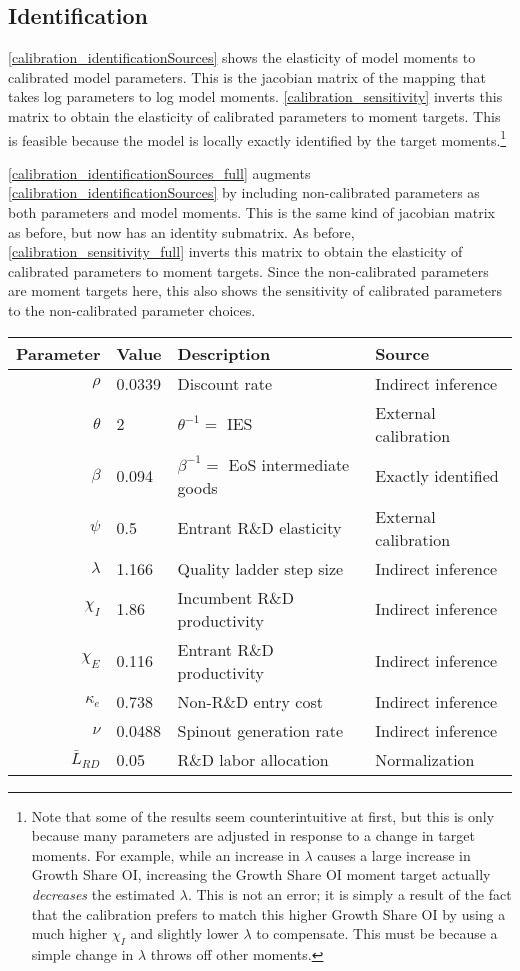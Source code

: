 \documentclass[11pt,english]{article}
\theoremstyle{remark}
\begin{document}
\normalsize

\subsection{Identification}

\autoref{calibration_identificationSources} shows the elasticity of model moments to calibrated model parameters. This is the jacobian matrix of the mapping that takes log parameters to log model moments. \autoref{calibration_sensitivity} inverts this matrix to obtain the elasticity of calibrated parameters to moment targets. This is feasible because the model is locally exactly identified by the target moments.\footnote{Note that some of the results seem counterintuitive at first, but this is only because many parameters are adjusted in response to a change in target moments. For example, while an increase in $\lambda$ causes a large increase in Growth Share OI, increasing the Growth Share OI moment target actually \textit{decreases} the estimated $\lambda$. This is not an error; it is simply a result of the fact that the calibration prefers to match this higher Growth Share OI by using a much higher $\chi_I$ and slightly lower $\lambda$ to compensate. This must be because a simple change in $\lambda$ throws off other moments.}

\autoref{calibration_identificationSources_full} augments \autoref{calibration_identificationSources} by including non-calibrated parameters as both parameters and model moments. This is the same kind of jacobian matrix as before, but now has an identity submatrix. As before, \autoref{calibration_sensitivity_full} inverts this matrix to obtain the elasticity of calibrated parameters to moment targets. Since the non-calibrated parameters are moment targets here, this also shows the sensitivity of calibrated parameters to the non-calibrated parameter choices.

\begin{table}[]
	\centering
	\label{calibration_parameters}
	\begin{tabular}{rlll}
		\toprule \toprule
		Parameter & Value & Description & Source \tabularnewline
		\midrule
		$\rho$ & 0.0339 & Discount rate  & Indirect inference \tabularnewline
		$\theta$ & 2 & $\theta^{-1} = $ IES & External calibration 
		\tabularnewline
		$\beta$ & 0.094 & $\beta^{-1} = $ EoS intermediate goods & Exactly identified \tabularnewline 
		$\psi$ & 0.5 & Entrant R\&D elasticity & External calibration \tabularnewline
		$\lambda$ & 1.166 & Quality ladder step size & Indirect inference 
		\tabularnewline
		$\chi_I$ & 1.86 & Incumbent R\&D productivity & Indirect inference 
		\tabularnewline
		$\chi_E$ & 0.116 & Entrant R\&D productivity & Indirect inference \tabularnewline 
		$\kappa_e$ & 0.738 & Non-R\&D entry cost & Indirect inference \tabularnewline
		$\nu$ & 0.0488 & Spinout generation rate  & Indirect inference\tabularnewline
		$\bar{L}_{RD}$ & 0.05 & R\&D labor allocation  & Normalization \tabularnewline
		\bottomrule
	\end{tabular}
\end{table}
\end{document}
